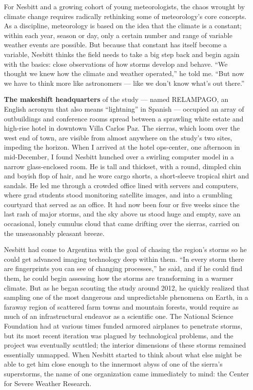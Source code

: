 For Nesbitt and a growing cohort of young meteorologists, the chaos
wrought by climate change requires radically rethinking some of
meteorology's core concepts. As a discipline, meteorology is based on
the idea that the climate is a constant; within each year, season or
day, only a certain number and range of variable weather events are
possible. But because that constant has itself become a variable,
Nesbitt thinks the field needs to take a big step back and begin again
with the basics: close observations of how storms develop and behave.
``We thought we knew how the climate and weather operated,'' he told me.
``But now we have to think more like astronomers --- like we don't know
what's out there.''

\textbf{The makeshift headquarters} of the study --- named RELAMPAGO, an
English acronym that also means ``lightning'' in Spanish --- occupied an
array of outbuildings and conference rooms spread between a sprawling
white estate and high-rise hotel in downtown Villa Carlos Paz. The
sierras, which loom over the west end of town, are visible from almost
anywhere on the study's two sites, impeding the horizon. When I arrived
at the hotel ops-center, one afternoon in mid-December, I found Nesbitt
hunched over a swirling computer model in a narrow glass-enclosed room.
He is tall and thickset, with a round, dimpled chin and boyish flop of
hair, and he wore cargo shorts, a short-sleeve tropical shirt and
sandals. He led me through a crowded office lined with servers and
computers, where grad students stood monitoring satellite images, and
into a crumbling courtyard that served as an office. It had now been
four or five weeks since the last rash of major storms, and the sky
above us stood huge and empty, save an occasional, lonely cumulus cloud
that came drifting over the sierras, carried on the unseasonably
pleasant breeze.

Nesbitt had come to Argentina with the goal of chasing the region's
storms so he could get advanced imaging technology deep within them.
``In every storm there are fingerprints you can see of changing
processes,'' he said, and if he could find them, he could begin
assessing how the storms are transforming in a warmer climate. But as he
began scouting the study around 2012, he quickly realized that sampling
one of the most dangerous and unpredictable phenomena on Earth, in a
faraway region of scattered farm towns and mountain forests, would
require as much of an infrastructural endeavor as a scientific one. The
National Science Foundation had at various times funded armored
airplanes to penetrate storms, but its most recent iteration was plagued
by technological problems, and the project was eventually scuttled; the
interior dimensions of these storms remained essentially unmapped. When
Nesbitt started to think about what else might be able to get him close
enough to the innermost abyss of one of the sierra's superstorms, the
name of one organization came immediately to mind: the Center for Severe
Weather Research.

